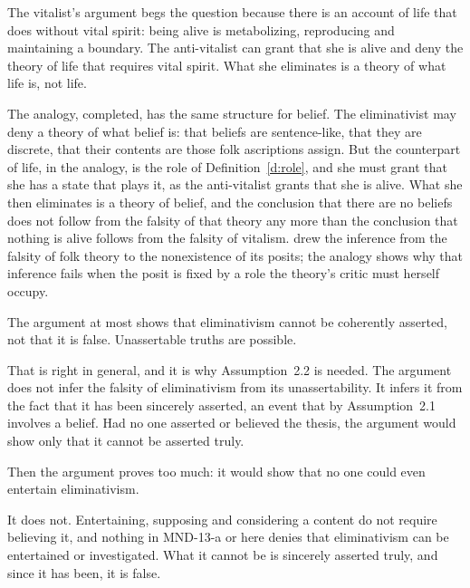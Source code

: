 \documentclass{situationist-preprint}
\begin{document}
The vitalist's argument begs the question because there is an account of life that does without vital spirit: being alive is metabolizing, reproducing and maintaining a boundary. The anti-vitalist can grant that she is alive and deny the theory of life that requires vital spirit. What she eliminates is a theory of what life is, not life.

The analogy, completed, has the same structure for belief. The eliminativist may deny a theory of what belief is: that beliefs are sentence-like, that they are discrete, that their contents are those folk ascriptions assign. But the counterpart of life, in the analogy, is the role of Definition~\ref{d:role}, and she must grant that she has a state that plays it, as the anti-vitalist grants that she is alive. What she then eliminates is a theory of belief, and the conclusion that there are no beliefs does not follow from the falsity of that theory any more than the conclusion that nothing is alive follows from the falsity of vitalism. \citet{Stich1983} drew the inference from the falsity of folk theory to the nonexistence of its posits; the analogy shows why that inference fails when the posit is fixed by a role the theory's critic must herself occupy.

\begin{objection}
The argument at most shows that eliminativism cannot be coherently asserted, not that it is false. Unassertable truths are possible.
\end{objection}

\begin{reply}
That is right in general, and it is why Assumption~2.2 is needed. The argument does not infer the falsity of eliminativism from its unassertability. It infers it from the fact that it has been sincerely asserted, an event that by Assumption~2.1 involves a belief. Had no one asserted or believed the thesis, the argument would show only that it cannot be asserted truly.
\end{reply}

\begin{objection}[Unthinkability]
Then the argument proves too much: it would show that no one could even entertain eliminativism.
\end{objection}

\begin{reply}
It does not. Entertaining, supposing and considering a content do not require believing it, and nothing in MND-13-a or here denies that eliminativism can be entertained or investigated. What it cannot be is sincerely asserted truly, and since it has been, it is false.
\end{reply}
\end{document}
